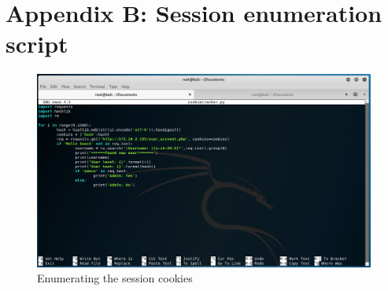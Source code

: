 \documentclass{report}
\begin{document}
\section{Appendix B: Session enumeration script}
\begin{figure}[!htb]
	\centering
	\includegraphics[scale=0.4]{img/cookiescript.png}
	\caption{Enumerating the session cookies}
\end{figure}


\end{document}
